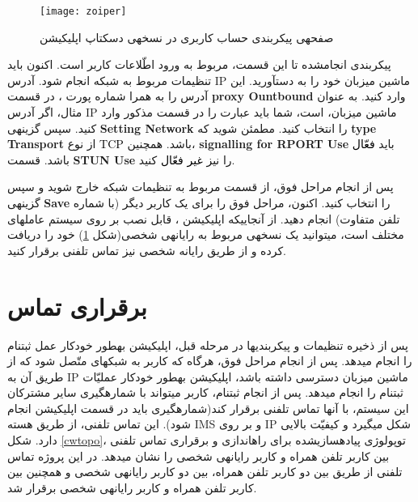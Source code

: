 \begin{figure}[h]
\centering
\texttt{[image: zoiper]}
\caption{صفحه\nf ی پیکربندی حساب کاربری در نسخه\nf ی دسکتاپ اپلیکیشن }
\label{zoiperpic}
\end{figure}


پیکربندی انجام\nf شده تا این قسمت، مربوط به ورود اطّلاعات کاربر است. اکنون باید تنظیمات مربوط به شبکه انجام شود. آدرس IP ماشین میزبان خود را به دست\nf آورید. این آدرس را به همرا شماره پورت ، در قسمت \textbf{proxy Ountbound} وارد کنید. به عنوان مثال، اگر آدرس IP ماشین میزبان،  است، شما باید عبارت  را در قسمت مذکور وارد کنید. سپس گزینه\nf ی \textbf{Setting Network} را انتخاب کنید. مطمئن شوید که \textbf{type Transport} از نوع \textcolor{black}{TCP} باشد. همچنین، \textbf{signalling for RPORT Use} باید \textcolor{black}{فعّال} باشد. قسمت \textbf{STUN Use} را نیز \textcolor{black}{غیر فعّال} کنید.

پس از انجام مراحل فوق، از قسمت مربوط به تنظیمات شبکه خارج شوید و سپس گزینه\nf ی \textbf{Save} را انتخاب کنید. اکنون، مراحل فوق را برای یک کاربر دیگر (با شماره تلفن متفاوت) انجام دهید. از آنجایی\nf که اپلیکیشن ، قابل نصب بر روی سیستم عامل\nf های مختلف است، می\nf توانید یک نسخه\nf ی مربوط به رایانه\nf ی شخصی(شکل \ref{zoiperpic}) خود را دریافت کرده و از طریق رایانه شخصی نیز تماس تلفنی برقرار کنید.



\section{برقراری تماس}
پس از ذخیره تنظیمات و پیکربندی\nf ها در مرحله قبل، اپلیکیشن به\nf طور خودکار عمل ثبت\nf نام را انجام می\nf دهد. پس از انجام مراحل فوق، هرگاه که کاربر به شبکه\nf ای متّصل شود که از طریق آن به IP ماشین میزبان دسترسی داشته باشد، اپلیکیشن  به\nf طور خودکار عملیّات ثبت\nf نام را انجام می\nf دهد. پس از انجام ثبت\nf نام، کاربر می\nf تواند با شماره\nf گیری سایر مشترکان این سیستم، با آن\nf ها تماس تلفنی برقرار کند(شماره\nf گیری باید در قسمت  اپلیکیشن  انجام شود). این تماس تلفنی، از طریق هسته IMS و بر روی IP شکل می\nf گیرد و کیفیّت بالایی دارد. شکل \ref{cwtopo}، توپولوژی پیاده\nf سازی\nf شده برای راه\nf اندازی  و برقراری تماس تلفنی بین کاربر تلفن همراه و کاربر رایانه\nf ی شخصی را نشان می\nf دهد.  در این پروژه تماس تلفنی از طریق  بین دو کاربر تلفن همراه، بین دو کاربر رایانه\nf ی شخصی و همچنین بین کاربر تلفن همراه و کاربر رایانه\nf ی شخصی برقرار شد.


